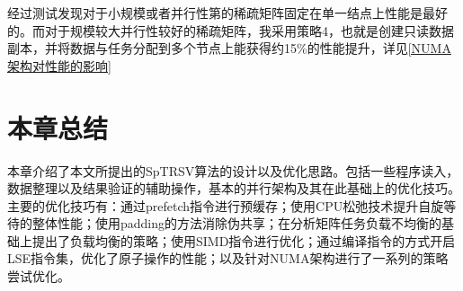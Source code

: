 经过测试发现对于小规模或者并行性第的稀疏矩阵固定在单一结点上性能是最好的。而对于规模较大并行性较好的稀疏矩阵，我采用策略4，也就是创建只读数据副本，并将数据与任务分配到多个节点上能获得约15\%的性能提升，详见\ref{NUMA架构对性能的影响}

\section{本章总结}

本章介绍了本文所提出的SpTRSV算法的设计以及优化思路。包括一些程序读入，数据整理以及结果验证的辅助操作，基本的并行架构及其在此基础上的优化技巧。主要的优化技巧有：通过prefetch指令进行预缓存；使用CPU松弛技术提升自旋等待的整体性能；使用padding的方法消除伪共享；在分析矩阵任务负载不均衡的基础上提出了负载均衡的策略；使用SIMD指令进行优化；通过编译指令的方式开启LSE指令集，优化了原子操作的性能；以及针对NUMA架构进行了一系列的策略尝试优化。


\endinput